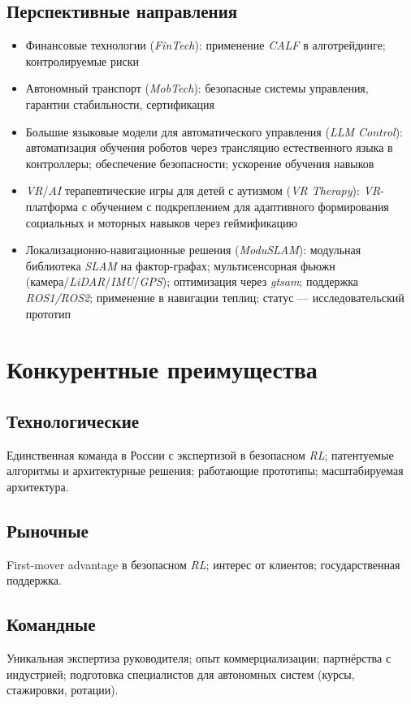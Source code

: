 \documentclass[12pt,a4paper]{article}
\begin{document}
\subsection*{Перспективные направления}
\begin{itemize}
    \item Финансовые технологии (\textit{FinTech}): применение \textit{CALF} в алготрейдинге; контролируемые риски
    \item Автономный транспорт (\textit{MobTech}): безопасные системы управления, гарантии стабильности, сертификация
    \item Большие языковые модели для автоматического управления (\textit{LLM Control}): автоматизация обучения роботов через трансляцию естественного языка в контроллеры; обеспечение безопасности; ускорение обучения навыков
    \item \textit{VR}/\textit{AI} терапевтические игры для детей с аутизмом (\textit{VR Therapy}): \textit{VR}-платформа с обучением с подкреплением для адаптивного формирования социальных и моторных навыков через геймификацию
    \item Локализационно-навигационные решения (\textit{ModuSLAM}): модульная библиотека \textit{SLAM} на фактор-графах; мультисенсорная фьюжн (камера/\textit{LiDAR}/\textit{IMU}/\textit{GPS}); оптимизация через \textit{gtsam}; поддержка \textit{ROS1/ROS2}; применение в навигации теплиц; статус --- исследовательский прототип

\end{itemize}

\section{Конкурентные преимущества}
\subsection*{Технологические}
Единственная команда в России с экспертизой в безопасном \textit{RL}; патентуемые алгоритмы и архитектурные решения; работающие прототипы; масштабируемая архитектура.

\subsection*{Рыночные}
First-mover advantage в безопасном \textit{RL}; интерес от клиентов; государственная поддержка.

\subsection*{Командные}
Уникальная экспертиза руководителя; опыт коммерциализации; партнёрства с индустрией; подготовка специалистов для автономных систем (курсы, стажировки, ротации).
\end{document}

